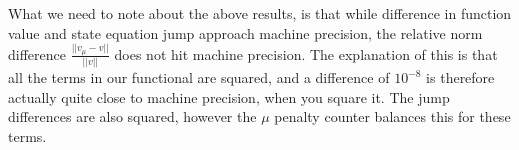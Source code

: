 What we need to note about the above results, is that while difference in function value and state equation jump approach machine precision, the relative norm difference $\frac{||v_{\mu}-v||}{||v||}$ does not hit machine precision. The explanation of this is that all the terms in our functional are squared, and a difference of $10^{-8}$ is therefore actually quite close to machine precision, when you square it. The jump differences are also squared, however the $\mu$ penalty counter balances this for these terms.

